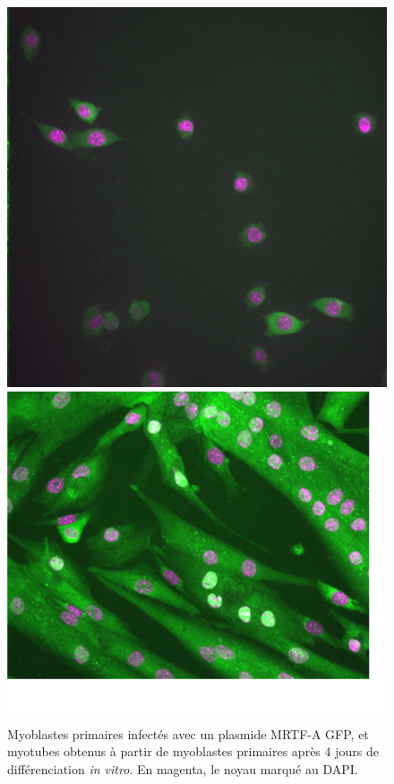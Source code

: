 \documentclass{report}
\begin{document}
\begin{figure}
\includegraphics[scale=0.25]{Figures/Myocytes.png} \includegraphics[scale=0.5]{Figures/Myotubes.png} 
\caption{Myoblastes primaires infectés avec un plasmide MRTF-A GFP, et myotubes obtenus à partir de myoblastes primaires après 4 jours de différenciation \textit{in vitro}. En magenta, le noyau marqué au DAPI.}
\end{figure}
\end{document}
